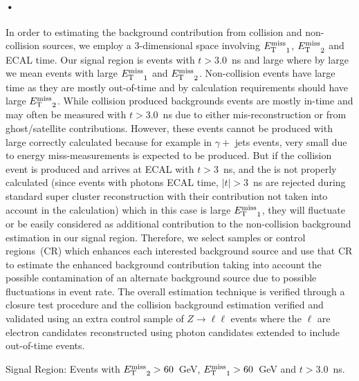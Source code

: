 \paragraph*{•} 
\par
In order to estimating the background contribution from collision and non-collision sources, we employ a 3-dimensional space involving ${E_{\mathrm{T}}^{\text{miss}}}_{1}$, ${E_{\mathrm{T}}^{\text{miss}}}_{2}$ and ECAL time.  Our signal region is events with $t > 3.0$~ns and large \MET where by large \MET we mean events with  large  ${E_{\mathrm{T}}^{\text{miss}}}_{1}$ and  ${E_{\mathrm{T}}^{\text{miss}}}_{2}$. Non-collision events have large time as they are mostly out-of-time and by \MET calculation requirements should have large  ${E_{\mathrm{T}}^{\text{miss}}}_{2}$. While collision produced backgrounds events are mostly in-time and may often be measured with $t > 3.0$~ns due to either mis-reconstruction or from ghost/satellite contributions. However, these events cannot be produced with large correctly calculated \MET because for example in $\gamma +$ jets events, very small \MET due to energy miss-measurements is expected to be produced.
 But if the collision event is produced and arrives at ECAL with $t > 3$~ns, and the \MET is not properly calculated (since events with photons ECAL time, $|t| > 3$~ns are rejected during standard super cluster reconstruction with their \pt contribution  not taken into account in the \MET calculation) which in this case is large ${E_{\mathrm{T}}^{\text{miss}}}_{1}$, they will fluctuate or be easily considered as additional contribution to the non-collision background estimation in our signal region.
Therefore, we select samples or control regions~(CR) which enhances each interested background source and use that CR to estimate the enhanced background contribution taking into account the possible contamination of an alternate background source due to possible fluctuations in event rate.
The overall estimation technique is verified through a closure test procedure and the collision background estimation verified and validated using an extra control sample of $Z \rightarrow \ell \ell$ events where the $\ell$ are electron candidates reconstructed using photon candidates extended to include out-of-time events.

Signal Region: Events with ${E_{\mathrm{T}}^{\text{miss}}}_{2} > 60$~GeV, ${E_{\mathrm{T}}^{\text{miss}}}_{1} > 60$~GeV and $t > 3.0$~ns.
